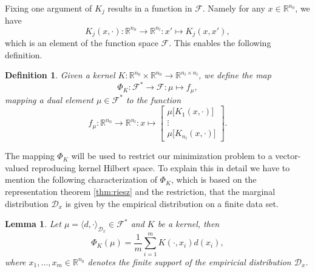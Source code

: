 \documentclass[11pt, a4paper]{article}
\newtheorem{lemma}[theorem]{Lemma}
\newtheorem{definition}[theorem]{Definition}
\newcommand{\R}{\mathbb{R}}
\newcommand{\D}{\mathcal{D}}
\newcommand{\F}{\mathcal{F}}
\begin{document}
Fixing one argument of $K_j$ results in a function in $\F$. Namely for any $x \in \R^{n_0}$, we have
\[ K_j(x,\cdot) : \R^{n_0} \to \R^{n_l} : x' \mapsto K_j(x,x'), \]
which is an element of the function space $\F$. This enables the following definition.

\begin{definition} \label{def:phi}
Given a kernel $K: \R^{n_0} \times \R^{n_0} \to \R^{n_l \times n_l}$, we define the map
\[ \Phi_K : \F^* \to \F : \mu \mapsto f_{\mu}, \]
mapping a dual element $\mu \in \F^*$ to the function
\[ f_{\mu} : \R^{n_0} \to \R^{n_l} : x \mapsto  \begin{bmatrix} \mu \big [K_1(x,\cdot) \big ] \\ \vdots \\ \mu \big [ K_{n_l}(x,\cdot) \big ] \end{bmatrix}. \]
\end{definition}

The mapping $\Phi_K$ will be used to restrict our minimization problem to a vector-valued reproducing kernel Hilbert space. To explain this in detail we have to mention the following characterization of $\Phi_K$, which is based on the representation theorem \ref{thm:riesz} and the restriction, that the marginal distribution $\D_x$ is given by the empirical distribution on a finite data set.

\begin{lemma} \label{lem:phi}
Let $\mu = \langle d, \cdot \rangle_{\D_x} \in \F^*$ and $K$ be a kernel, then
\[ \Phi_K(\mu) = \frac{1}{m}\sum_{i=1}^{m} K(\cdot,x_i)d(x_i), \]
where $x_1, \dots, x_m \in \R^{n_0}$ denotes the finite support of the empiricial distribution $\D_x$.
\end{lemma}
\end{document}
